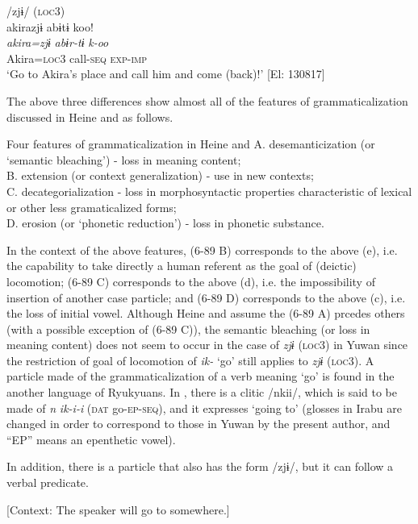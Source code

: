 \ex /zjɨ/ (\textsc{loc3})\\
{\TM}
\glll  akirazjɨ  abɨtɨ  koo!\\
\textit{akira=zjɨ}  \textit{abɨr-tɨ}  \textit{k-oo}\\
Akira=\textsc{loc3}  call-\textsc{seq}  \textsc{exp}-\textsc{imp}\\
 \glt ‘Go to Akira’s place and call him and come (back)!’ [El: 130817]
\z
\z

The above three differences show almost all of the features of grammaticalization discussed in Heine and \citet[2]{Kuteva2002} as follows.

\ea\label{ex:6-89}
 Four features of grammaticalization in Heine and \citet[2]{Kuteva2002}
A.  desemanticization (or ‘semantic bleaching’) - loss in meaning content;\\
B.  extension (or context generalization) - use in new contexts;\\
C.    decategorialization - loss in morphosyntactic properties characteristic of lexical or other less gramaticalized forms;\\
D.  erosion (or ‘phonetic reduction’) - loss in phonetic substance.
\z

In the context of the above features, (6-89 B) corresponds to the above (e), i.e. the capability to take directly a human referent as the goal of (deictic) locomotion; (6-89 C) corresponds to the above (d), i.e. the impossibility of insertion of another case particle; and (6-89 D) corresponds to the above (c), i.e. the loss of initial vowel. Although Heine and \citet[3]{Kuteva2002} assume the (6-89 A) prcedes others (with a possible exception of (6-89 C)), the semantic bleaching (or loss in meaning content) does not seem to occur in the case of \textit{zjɨ} (\textsc{loc3}) in Yuwan since the restriction of goal of locomotion of \textit{ik-} ‘go’ still applies to \textit{zjɨ} (\textsc{loc3}). A particle made of the grammaticalization of a verb meaning ‘go’ is found in the another language of Ryukyuans. In \citet[207]{Shimoji2008}, there is a clitic /nkii/, which is said to be made of \textit{n} \textit{ik-i-i} (\textsc{dat} go-\textsc{ep}-\textsc{seq}), and it expresses ‘going to’ (glosses in Irabu are changed in order to correspond to those in Yuwan by the present author, and “EP” means an epenthetic vowel).

  In addition, there is a particle that also has the form /zjɨ/, but it can follow a verbal predicate.

\ea\label{ex:6-90}
  [Context: The speaker will go to somewhere.]

